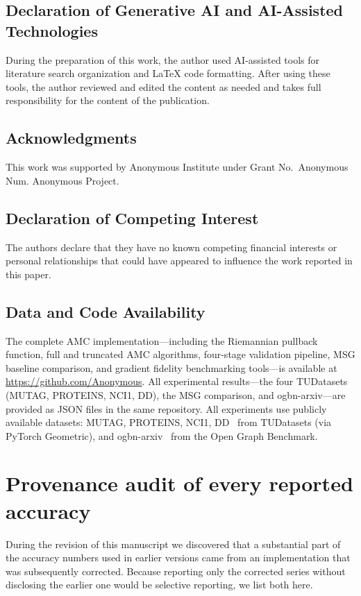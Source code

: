 \documentclass[a4paper,fleqn]{cas-dc}
\begin{document}
\subsection*{Declaration of Generative AI and AI-Assisted Technologies}
During the preparation of this work, the author used AI-assisted tools for literature search organization and LaTeX code formatting. After using these tools, the author reviewed and edited the content as needed and takes full responsibility for the content of the publication.

\subsection*{Acknowledgments}
This work was supported by Anonymous Institute under Grant No.\ Anonymous Num. Anonymous Project.

\subsection*{Declaration of Competing Interest}
The authors declare that they have no known competing financial interests or personal relationships that could have appeared to influence the work reported in this paper.

\subsection*{Data and Code Availability}
The complete AMC implementation---including the Riemannian pullback function, full and truncated AMC algorithms, four-stage validation pipeline, MSG baseline comparison, and gradient fidelity benchmarking tools---is available at \url{https://github.com/Anonymous}. All experimental results---the four TUDatasets (MUTAG, PROTEINS, NCI1, DD), the MSG comparison, and ogbn-arxiv---are provided as JSON files in the same repository. All experiments use publicly available datasets: MUTAG, PROTEINS, NCI1, DD~\citep{Xu19} from TUDatasets (via PyTorch Geometric), and ogbn-arxiv~\citep{hu2020open} from the Open Graph Benchmark.

\appendix
\section{Provenance audit of every reported accuracy}
\label{app:provenance}

During the revision of this manuscript we discovered that a substantial
part of the accuracy numbers used in earlier versions came from an
implementation that was subsequently corrected. Because reporting only
the corrected series without disclosing the earlier one would be
selective reporting, we list both here.
\end{document}
